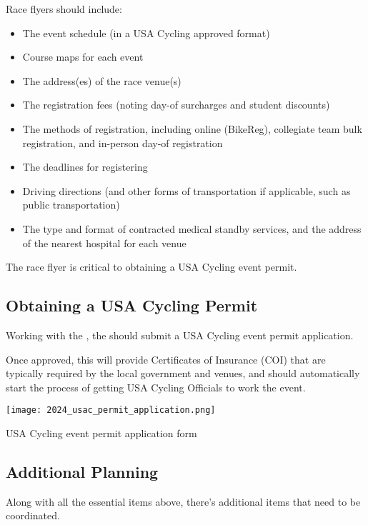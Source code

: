 Race flyers should include:
\begin{itemize}
  \item The event schedule (in a USA Cycling approved format)
  \item Course maps for each event
  \item The address(es) of the race venue(s)
  \item The registration fees (noting day-of surcharges and student discounts)
  \item The methods of registration, including online (BikeReg), collegiate team bulk registration, and in-person day-of registration
  \item The deadlines for registering
  \item Driving directions (and other forms of transportation if applicable, such as public transportation)
  \item The type and format of contracted medical standby services, and the address of the nearest hospital for each venue
\end{itemize}

The race flyer is critical to obtaining a USA Cycling event permit.

\subsection[USA Cycling Permitting]{Obtaining a USA Cycling Permit}

Working with the , the  should submit a USA Cycling event permit application.

Once approved, this will provide Certificates of Insurance (COI) %
that are typically required by the local government and venues,
and should automatically start the process of getting USA Cycling Officials to work the event.

\begin{marginfigure}
  \texttt{[image: 2024\_usac\_permit\_application.png]}
  \caption{USA Cycling event permit application form}
\end{marginfigure}

\subsection{Additional Planning}

Along with all the essential items above, there's additional items that need to be coordinated.

